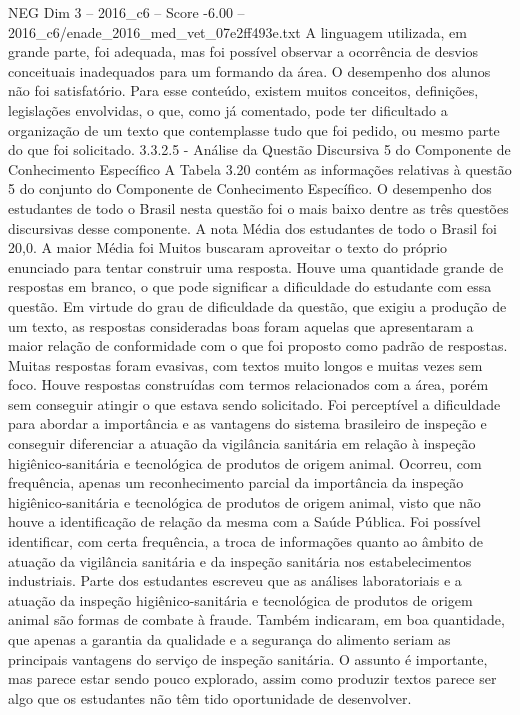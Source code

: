 \begin{textsample}{NEG Dim 3 – 2016\_c6 – Score -6.00 – 2016\_c6/enade\_2016\_med\_vet\_07e2ff493e.txt}
A linguagem utilizada, em grande parte, foi adequada, mas foi possível observar a ocorrência de desvios conceituais inadequados para um formando da área.
O desempenho dos alunos não foi satisfatório.
Para esse conteúdo, existem muitos conceitos, definições, legislações envolvidas, o que, como já comentado, pode ter dificultado a organização de um texto que contemplasse tudo que foi pedido, ou mesmo parte do que foi solicitado. 3.3.2.5 - Análise da Questão Discursiva 5 do Componente de Conhecimento Específico A Tabela 3.20 contém as informações relativas à questão 5 do conjunto do Componente de Conhecimento Específico.
O desempenho dos estudantes de todo o Brasil nesta questão foi o mais baixo dentre as três questões discursivas desse componente.
A nota Média dos estudantes de todo o Brasil foi 20,0.
A maior Média foi Muitos buscaram aproveitar o texto do próprio enunciado para tentar construir uma resposta.
Houve uma quantidade grande de respostas em branco, o que pode significar a dificuldade do estudante com essa questão.
Em virtude do grau de dificuldade da questão, que exigiu a produção de um texto, as respostas consideradas boas foram aquelas que apresentaram a maior relação de conformidade com o que foi proposto como padrão de respostas.
Muitas respostas foram evasivas, com textos muito longos e muitas vezes sem foco.
Houve respostas construídas com termos relacionados com a área, porém sem conseguir atingir o que estava sendo solicitado.
Foi perceptível a dificuldade para abordar a importância e as vantagens do sistema brasileiro de inspeção e conseguir diferenciar a atuação da vigilância sanitária em relação à inspeção higiênico-sanitária e tecnológica de produtos de origem animal.
Ocorreu, com frequência, apenas um reconhecimento parcial da importância da inspeção higiênico-sanitária e tecnológica de produtos de origem animal, visto que não houve a identificação de relação da mesma com a Saúde Pública.
Foi possível identificar, com certa frequência, a troca de informações quanto ao âmbito de atuação da vigilância sanitária e da inspeção sanitária nos estabelecimentos industriais.
Parte dos estudantes escreveu que as análises laboratoriais e a atuação da inspeção higiênico-sanitária e tecnológica de produtos de origem animal são formas de combate à fraude.
Também indicaram, em boa quantidade, que apenas a garantia da qualidade e a segurança do alimento seriam as principais vantagens do serviço de inspeção sanitária.
O assunto é importante, mas parece estar sendo pouco explorado, assim como produzir textos parece ser algo que os estudantes não têm tido oportunidade de desenvolver.

\end{textsample}
